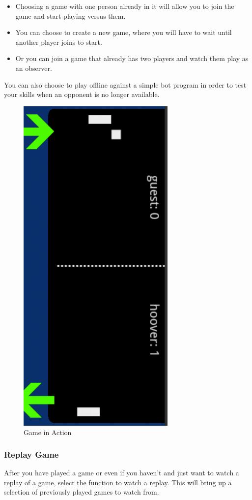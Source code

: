 \documentclass[12pt]{article}
\begin{document}
\begin{itemize}
\item Choosing a game with one person already in it will allow you to join the game and start playing versus them.
\item You can choose to create a new game, where you will have to wait until another player joins to start.
\item Or you can join a game that already has two players and watch them play as an observer.
\end{itemize}
You can also choose to play offline against a simple bot program in order to test your skills when an opponent is no longer available.
\begin{figure}
\begin{center}
\includegraphics[scale=.7]{ touchOnServer.png}
\caption{\label{PlayingGame}Game in Action}
\end{center}
\end{figure}

\subsubsection{Replay Game}
After you have played a game or even if you haven’t and just want to watch a replay of a game, select the function to watch a replay. This will bring up a selection of previously played games to watch from.
\end{document}
